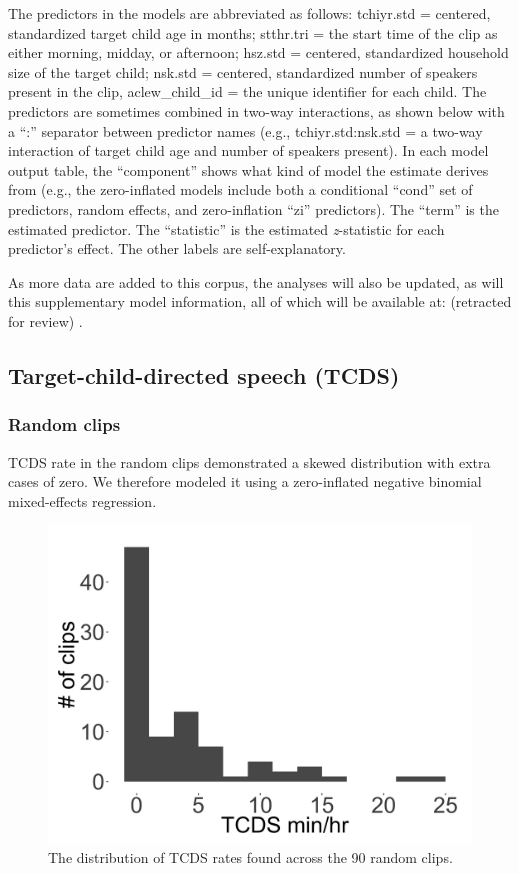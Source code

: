 \documentclass[floatsintext,man]{apa6}
\theoremstyle{definition}
\theoremstyle{definition}
\theoremstyle{definition}
\theoremstyle{remark}
\begin{document}
The predictors in the models are abbreviated as follows: tchiyr.std =
centered, standardized target child age in months; stthr.tri = the start
time of the clip as either morning, midday, or afternoon; hsz.std =
centered, standardized household size of the target child; nsk.std =
centered, standardized number of speakers present in the clip,
aclew\_child\_id = the unique identifier for each child. The predictors
are sometimes combined in two-way interactions, as shown below with a
\enquote{:} separator between predictor names (e.g., tchiyr.std:nsk.std
= a two-way interaction of target child age and number of speakers
present). In each model output table, the \enquote{component} shows what
kind of model the estimate derives from (e.g., the zero-inflated models
include both a conditional \enquote{cond} set of predictors, random
effects, and zero-inflation \enquote{zi} predictors). The \enquote{term}
is the estimated predictor. The \enquote{statistic} is the estimated
\emph{z}-statistic for each predictor's effect. The other labels are
self-explanatory.

As more data are added to this corpus, the analyses will also be
updated, as will this supplementary model information, all of which will
be available at: (retracted for review) .

\subsection{Target-child-directed speech (TCDS)}\label{models-tcds}

\subsubsection{Random clips}\label{models-tcds-random}

TCDS rate in the random clips demonstrated a skewed distribution with
extra cases of zero. We therefore modeled it using a zero-inflated
negative binomial mixed-effects regression.

\FloatBarrier

\begin{figure}[H]

{\centering \includegraphics[width=0.4\linewidth]{www/TCDS_random_distribution} 

}

\caption{The distribution of TCDS rates found across the 90 random clips.}\label{fig:fig1}
\end{figure}
\end{document}
